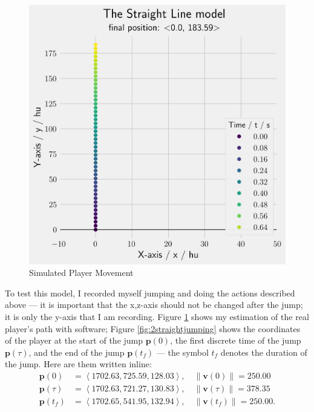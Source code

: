 \documentclass[a4paper,12pt]{article}
\newcommand{\tvec}[1]{\boldsymbol{#1}}
\newcommand{\tmag}[1]{\|#1\|}
\newcommand{\tang}[1]{\left\langle #1 \right\rangle}
\newcommand{\tv}{\tvec{v}}
\newcommand{\tp}{\tvec{p}}
\begin{document}
\begin{figure}[H]
\begin{minipage}{.5\textwidth}
        \includegraphics[width=0.9\linewidth]{assets/straight_constraint.png}
        \caption{Simulated Player Movement}
        \label{fig:straight_constraint}
    \end{minipage}
\end{figure}

To test this model, I recorded myself jumping and doing the actions described above --- it is important that the x,z-axis should not be changed after the jump; it is only the y-axis that I am recording. Figure \ref{fig:straight_constraint} shows my estimation of the real player's path with software; Figure \ref{fig:2straightjumping} shows the coordinates of the player at the start of the jump $\tp(0)$, the first discrete time of the jump $\tp(\tau)$, and the end of the jump $\tp(t_f)$ --- the symbol $t_f$ denotes the duration of the jump. Here are them written inline:
\begin{align}
 \tp(0) &= \tang{1702.63, 725.59, 128.03}, \quad \tmag{\tv(0)} = 250.00 \label{eq:2emp0}\\
 \tp(\tau) &= \tang{1702.63, 721.27, 130.83}, \quad \tmag{\tv(\tau)} = 378.35 \label{eq:2emp1}\\
 \tp(t_f) &= \tang{1702.65,541.95, 132.94}, \quad \tmag{\tv(t_f)} = 250.00 \label{eq:2emp2}.
\end{align}
\end{document}
